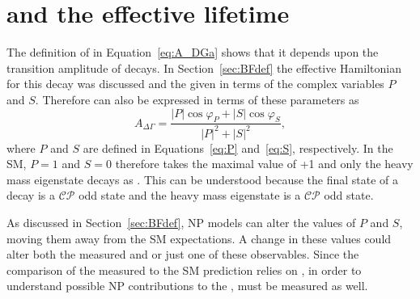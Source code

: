 \section[\ADG and the \bsmumu effective lifetime]{\boldmath{\ADG} and the \boldmaht{\bsmumu} effective lifetime}
\label{sec:ADG_EL}
The definition of \ADG in Equation~\ref{eq:A_DGa} shows that it depends upon the transition amplitude of \bsmumu decays. In Section~\ref{sec:BFdef} the effective Hamiltonian for this decay was discussed and the \BF given in terms of the complex variables $P$ and $S$. Therefore \ADG can also be expressed in terms of these parameters as~\cite{DeBruyn:2012wk}
\begin{equation}
A_{\Delta \Gamma} = \frac{|P|\cos \varphi_P + |S| \cos \varphi_S}{|P|^2 + |S|^2},
\label{eq:NP_ADG}
\end{equation}
where $P$ and $S$ are defined in Equations~\ref{eq:P} and~\ref{eq:S}, respectively.
In the SM, $P=1$ and $S=0$ therefore \ADG takes the maximal value of +1 and only the heavy mass eigenstate decays as \bsmumu. This can be understood because the final state of a \bsmumu decay is a $\mathcal{CP}$ odd state and the heavy \bs mass eigenstate is a $\mathcal{CP}$ odd state.

As discussed in Section~\ref{sec:BFdef}, NP models can alter the values of $P$ and $S$, moving them away from the SM expectations. A change in these values could alter both the measured \BF and \ADG or just one of these observables. Since the comparison of the measured \BF to the SM prediction relies on \ADG, in order to understand possible NP contributions to the \BF, \ADG must be measured as well. 

